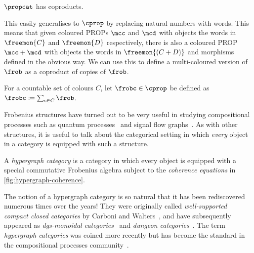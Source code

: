 \begin{theorem}
    \(\propcat\) has coproducts.
\end{theorem}

This easily generalises to \(\cprop\) by replacing natural numbers with words.
This means that given coloured PROPs \(\mcc\) and \(\mcd\) with objects the
words in \(\freemon{C}\) and \(\freemon{D}\) respectively, there is also a
coloured PROP \(\mcc + \mcd\) with objects the words in \(\freemon{(C + D)}\)
and morphisms defined in the obvious way.
We can use this to define a multi-coloured version of \(\frob\) as
a coproduct of copies of \(\frob\).

\begin{definition}
    \label{def:frobc}
    For a countable set of colours \(C\), let \(\frobc \in \cprop\) be
    defined as \(\frobc \coloneqq \sum_{c \in C}\frob\).
\end{definition}

Frobenius structures have turned out to be very useful in studying compositional
processes such as quantum processes~\cite{coecke2008interacting} and signal flow
graphs~\cite{bonchi2014categorical,bonchi2015full}.
As with other structures, it is useful to talk about the categorical setting in
which \emph{every} object in a category is equipped with such a structure.

\begin{definition}
    \label{def:hypergraph-category}
    A \emph{hypergraph category} is a category in which every object is equipped
    with a special commutative Frobenius algebra subject to the
    \emph{coherence equations} in \cref{fig:hypergraph-coherence}.
\end{definition}



\begin{remark}
    The notion of a hypergraph category is so natural that it has been
    rediscovered numerous times over the years!
    They were originally called \emph{well-supported compact closed categories}
    by Carboni and Walters~\cite{carboni1987cartesian}, and have subsequently
    appeared as
    \emph{dgs-monoidal categories}~\cite{katis1997bicategories,gadducci1998inductive,gadducci1999bicategorical,bruni2002normal}
    and \emph{dungeon categories}~\cite{morton2014belief}.
    The term \emph{hypergraph categories} was coined more recently but has
    become the standard in the compositional processes
    community~\cite{kissinger2015finite,fong2015decorated,baez2016compositional,baez2018compositional}.
\end{remark}

